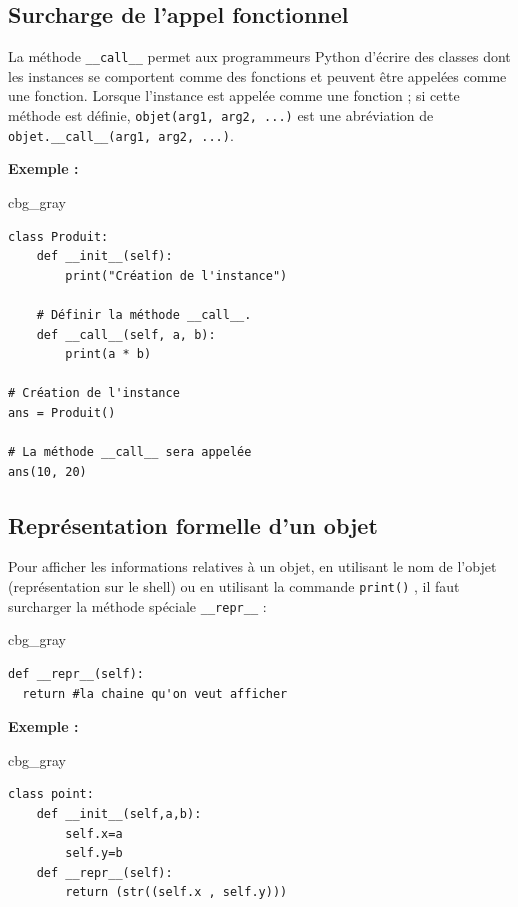 \documentclass[%
oneside,                 %
final,                   %
10pt]{article}
\newenvironment{_cod_tight}[1]{
   \def\FrameCommand{\colorbox{#1}}
   \FrameRule0.6pt\MakeFramed {\FrameRestore}\vskip3mm}
   {\vskip0mm\endMakeFramed}
\newenvironment{cod}[1]{
\bgroup\rmfamily
\fboxsep=0mm\relax
\begin{_cod_tight}{#1}
\list{}{\parsep=-2mm\parskip=0mm\topsep=0pt\leftmargin=2mm
\rightmargin=2\leftmargin\leftmargin=4pt\relax}
\item\relax}
{\endlist\end{_cod_tight}\egroup}
\begin{document}
\noindent
\subsection{Surcharge de l'appel fonctionnel}
La méthode \Verb!__call__! permet aux programmeurs Python d'écrire des classes dont les instances se comportent comme des fonctions et peuvent être appelées comme une fonction. Lorsque l'instance est appelée comme une fonction ; si cette méthode est définie, \texttt{objet(arg1, arg2, ...)} est une abréviation de \Verb!objet.__call__(arg1, arg2, ...)!.

\textbf{Exemple :}

\begin{cod}{cbg_gray}\begin{verbatim}
class Produit:
	def __init__(self):
		print("Création de l'instance")

	# Définir la méthode __call__.
	def __call__(self, a, b):
		print(a * b)

# Création de l'instance
ans = Produit()

# La méthode __call__ sera appelée
ans(10, 20)
\end{verbatim}
\end{cod}
\noindent

\subsection{Représentation formelle d'un objet}

Pour afficher les informations relatives à un objet, en utilisant le nom de l'objet (représentation sur le shell) ou en utilisant la commande \texttt{print()} , il faut surcharger la méthode spéciale \Verb!__repr__! :
\begin{cod}{cbg_gray}\begin{verbatim}
def __repr__(self):
  return #la chaine qu'on veut afficher
\end{verbatim}
\end{cod}
\noindent

\textbf{Exemple :}

\begin{cod}{cbg_gray}\begin{verbatim}
class point:
    def __init__(self,a,b):
        self.x=a
        self.y=b
    def __repr__(self):
        return (str((self.x , self.y)))
\end{verbatim}
\end{cod}
\noindent
\end{document}

